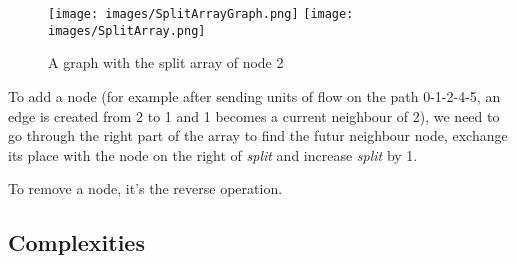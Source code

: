 \begin{figure}[!h]
\texttt{[image: images/SplitArrayGraph.png]}\hfill
\texttt{[image: images/SplitArray.png]}
\caption{A graph with the split array of node 2}
\end{figure}

To add a node (for example after sending units of flow on the path 0-1-2-4-5, an edge is created from 2 to 1 and 1 becomes a current neighbour of 2), we need to go through the right part of the array to find the futur neighbour node, exchange its place with the node on the right of \textit{split} and increase \textit{split} by 1. \newline

To remove a node, it's the reverse operation.


\subsection{Complexities}
